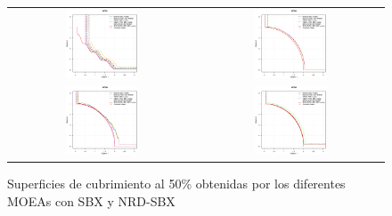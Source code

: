 \begin{figure}[t] 
\scriptsize
\centering
\begin{tabular}{cccc}
  \multicolumn{2}{c}{\includegraphics[width=0.40\textwidth]{Figures_Chapter7/Results_Chapter5/WFG1.eps}} &  \multicolumn{2}{c}{\includegraphics[width=0.40\textwidth]{Figures_Chapter7/Results_Chapter5/WFG5.eps}} \\
  \multicolumn{2}{c}{ \includegraphics[width=0.40\textwidth]{Figures_Chapter7/Results_Chapter5/WFG8.eps}} & \multicolumn{2}{c}{\includegraphics[width=0.40\textwidth]{Figures_Chapter7/Results_Chapter5/WFG9.eps}}
\end{tabular}
\caption{Superficies de cubrimiento al 50\% obtenidas por los diferentes MOEAs con SBX y NRD-SBX}
 \label{fig:Attainment_Surfaces_State_Art_SBX}
\end{figure}


